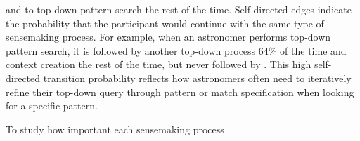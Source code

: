  and to top-down pattern search
 the rest of the time.
 Self-directed edges indicate the probability that the participant
 would continue with the same type of sensemaking process.
 For example, when an astronomer performs top-down pattern search,
 it is followed by another top-down process 64\% of the time and context creation the rest of the time,
 but never followed by .
 This high self-directed transition probability
 reflects how astronomers often need to iteratively
 refine their top-down query through pattern
 or match specification when looking for a specific pattern. %
 \par To study how important each sensemaking process
